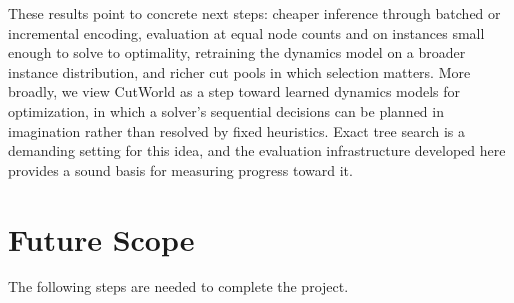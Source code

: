 \documentclass[11pt,a4paper]{article}
\begin{document}
These results point to concrete next steps: cheaper inference through batched or incremental encoding, evaluation at equal node counts and on instances small enough to solve to optimality, retraining the dynamics model on a broader instance distribution, and richer cut pools in which selection matters. More broadly, we view CutWorld as a step toward learned dynamics models for optimization, in which a solver's sequential decisions can be planned in imagination rather than resolved by fixed heuristics. Exact tree search is a demanding setting for this idea, and the evaluation infrastructure developed here provides a sound basis for measuring progress toward it.


\section{Future Scope}
\label{sec:future}

The following steps are needed to complete the project.
\end{document}
